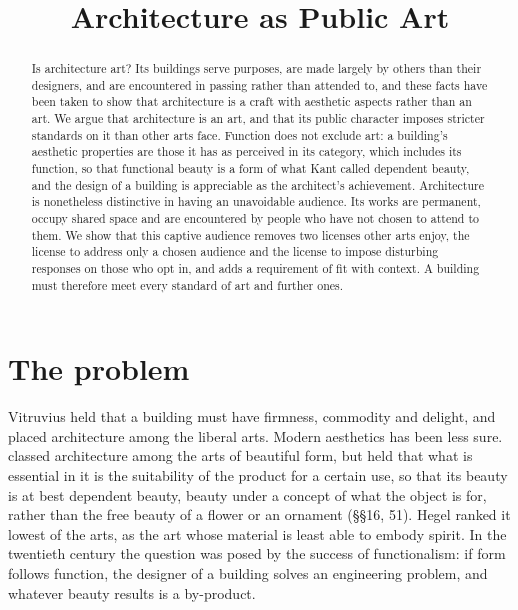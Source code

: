 \documentclass{situationist-preprint}
\title{Architecture as Public Art}
\begin{document}
\maketitle

\begin{abstract}
Is architecture art? Its buildings serve purposes, are made largely by others than their designers, and are encountered in passing rather than attended to, and these facts have been taken to show that architecture is a craft with aesthetic aspects rather than an art. We argue that architecture is an art, and that its public character imposes stricter standards on it than other arts face. Function does not exclude art: a building's aesthetic properties are those it has as perceived in its category, which includes its function, so that functional beauty is a form of what Kant called dependent beauty, and the design of a building is appreciable as the architect's achievement. Architecture is nonetheless distinctive in having an unavoidable audience. Its works are permanent, occupy shared space and are encountered by people who have not chosen to attend to them. We show that this captive audience removes two licenses other arts enjoy, the license to address only a chosen audience and the license to impose disturbing responses on those who opt in, and adds a requirement of fit with context. A building must therefore meet every standard of art and further ones.
\end{abstract}

\section{The problem}

Vitruvius held that a building must have firmness, commodity and delight, and placed architecture among the liberal arts. Modern aesthetics has been less sure. \citet{Kant1790} classed architecture among the arts of beautiful form, but held that what is essential in it is the suitability of the product for a certain use, so that its beauty is at best dependent beauty, beauty under a concept of what the object is for, rather than the free beauty of a flower or an ornament (\S\S16, 51). Hegel ranked it lowest of the arts, as the art whose material is least able to embody spirit. In the twentieth century the question was posed by the success of functionalism: if form follows function, the designer of a building solves an engineering problem, and whatever beauty results is a by-product.
\end{document}
